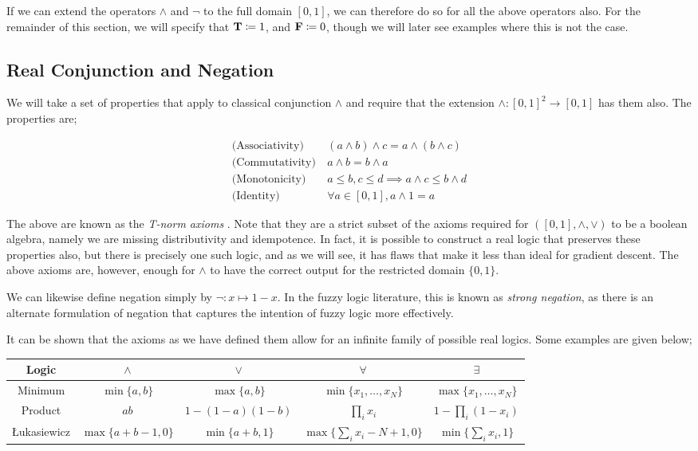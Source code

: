 If we can extend the operators $\land$ and $\neg$ to the full domain $[0,1]$, we can therefore do so for all the above operators also. For the remainder of this section, we will specify that $\textbf{T} \coloneqq 1$, and $\textbf{F} \coloneqq 0$, though we will later see examples where this is not the case.

\subsection{Real Conjunction and Negation}

We will take a set of properties that apply to classical conjunction $\land$ and require that the extension $\land : [0,1]^2 \to [0,1]$ has them also. The properties are;

$$
\begin{aligned}
\text{(Associativity)}&\ (a \land b) \land c = a \land (b \land c) \\
\text{(Commutativity)}&\ a \land b = b \land a \\
\text{(Monotonicity)}&\ a \leq b, c \leq d \implies a \land c \leq b \land d \\
\text{(Identity)}&\ \forall a \in [0,1], a \land 1 = a
\end{aligned}
$$

The above are known as the \textit{T-norm axioms} \cite{tnorms}. Note that they are a strict subset of the axioms required for $([0,1], \land, \lor)$ to be a boolean algebra, namely we are missing distributivity and idempotence. In fact, it is possible to construct a real logic that preserves these properties also, but there is precisely one such logic, and as we will see, it has flaws that make it less than ideal for gradient descent. The above axioms are, however, enough for $\land$ to have the correct output for the restricted domain $\{0,1\}$. 

We can likewise define negation simply by $\lnot : x \mapsto 1 - x$. In the fuzzy logic literature, this is known as \textit{strong negation}, as there is an alternate formulation of negation that captures the intention of fuzzy logic more effectively.

It can be shown that the axioms as we have defined them allow for an infinite family of possible real logics. Some examples are given below;

\begin{center}
\begin{tabular}{ c | c c c c }
    Logic & $\land$ & $\lor$ & $\forall$ & $\exists$ \\    
    \hline
    Minimum 
    & $\min\{a,b\}$ 
    & $\max\{a,b\}$ 
    & $\min\{ x_1, \dots, x_N \}$ 
    & $\max\{ x_1, \dots, x_N \}$ \\ 
    Product 
    & $ab$
    & $1 - (1 - a)(1 - b)$
    & $\prod_ix_i$
    & $1 - \prod_{i}(1-x_i)$ \\
    Łukasiewicz
    & $\max\{a+b-1, 0\}$ 
    & $\min\{a+b, 1\}$ 
    & $\max\{\sum_ix_i - N + 1, 0\}$ 
    & $\min\{\sum_ix_i, 1\}$ \\
\end{tabular}
\end{center}


